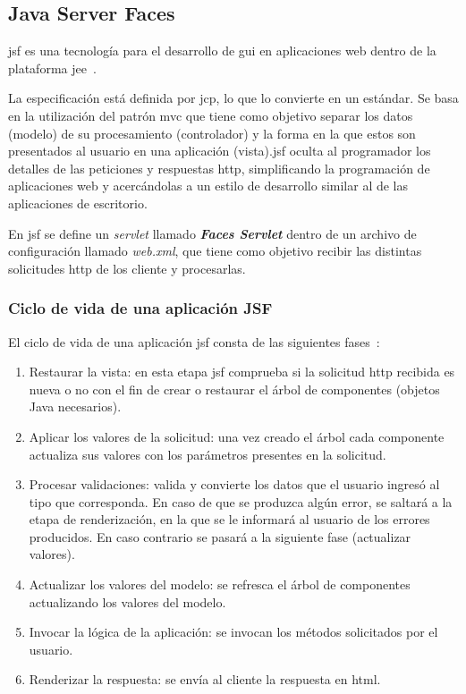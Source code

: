 \subsection{Java Server Faces}
\label{sec:jsf}
\acrfull{jsf} es una tecnología para el desarrollo de \acrshort{gui} en aplicaciones web dentro de la plataforma \acrshort{jee}~\cite{DesarrolloJakartaEE}.

La especificación está definida por \acrfull{jcp}, lo que lo convierte en un estándar. Se basa en la utilización del patrón  \acrfull{mvc} que tiene como objetivo separar los datos (modelo) de su procesamiento (controlador) y la forma en la que estos son presentados al usuario en una aplicación (vista).\acrshort{jsf} oculta al programador los detalles de las peticiones y respuestas \acrshort{http}, simplificando la programación de aplicaciones web y acercándolas a un estilo de desarrollo similar al de las aplicaciones de escritorio.

En \acrshort{jsf} se define un \emph{servlet} llamado \emph{\textbf{Faces Servlet}} dentro de un archivo de configuración llamado \emph{web.xml}, que tiene como objetivo recibir las distintas solicitudes \acrshort{http} de los cliente y procesarlas. 

\subsubsection{Ciclo de vida de una aplicación JSF}
\label{sec:ciclo-vida-jsf}
El ciclo de vida de una aplicación \acrshort{jsf} consta de las siguientes fases~\cite{DesarrolloJakartaEE}:
\begin{enumerate}
\item Restaurar la vista: en esta etapa \acrshort{jsf} comprueba si la solicitud \acrshort{http} recibida es nueva o no con el fin de crear o restaurar el árbol de componentes (objetos Java necesarios).
\item Aplicar los valores de la solicitud: una vez creado el árbol cada componente actualiza sus valores con los parámetros presentes en la solicitud.
\item Procesar validaciones: valida y convierte los datos que el usuario ingresó al tipo que corresponda. En caso de que se produzca algún error, se saltará a la etapa de renderización, en la que se le informará al usuario de los errores producidos. En caso contrario se pasará a la siguiente fase (actualizar valores).
\item Actualizar los valores del modelo: se refresca el árbol de componentes actualizando los valores del modelo.
\item Invocar la lógica de la aplicación: se invocan los métodos solicitados por el usuario.
\item Renderizar la respuesta: se envía al cliente la respuesta en \acrshort{html}.
\end{enumerate}


